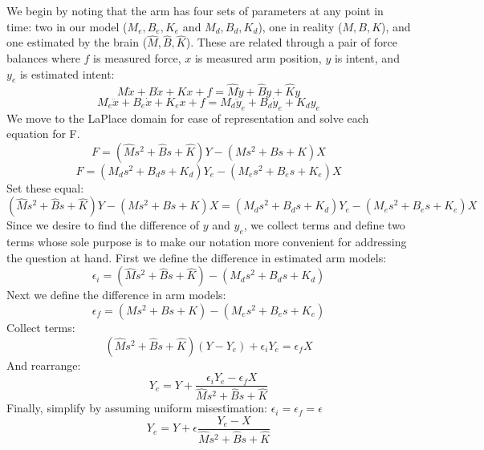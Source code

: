 \documentclass[10pt]{article}
\begin{document}
We begin by noting that the arm has four sets of parameters at any point in time: two in our model ($M_e, B_e, K_e$ and $M_d, B_d, K_d$), one in reality ($M, B, K$), and one estimated by the brain ($\hat{M}, \hat{B}, \hat{K}$). These are related through a pair of force balances where $f$ is measured force, $x$ is measured arm position, $y$ is intent, and $y_e$ is estimated intent:
\begin{equation}
M\ddot{x}+B\dot{x}+Kx+f=\hat{M}\ddot{y}+\hat{B}\dot{y}+\hat{K}y
\end{equation}
\begin{equation}
M_e\ddot{x}+B_e\dot{x}+K_ex+f=M_d\ddot{y}_e+B_d\dot{y}_e+K_dy_e
\end{equation}
We move to the LaPlace domain for ease of representation and solve each equation for F.
\begin{equation}
F=(\hat{M}s^2+\hat{B}s+\hat{K})Y-(Ms^2+Bs+K)X
\end{equation}
\begin{equation}
F=(M_ds^2+B_ds+K_d)Y_e-(M_es^2+B_es+K_e)X
\end{equation}
Set these equal:
\begin{equation}
(\hat{M}s^2+\hat{B}s+\hat{K})Y-(Ms^2+Bs+K)X=(M_ds^2+B_ds+K_d)Y_e-(M_es^2+B_es+K_e)X
\end{equation}
Since we desire to find the difference of $y$ and $y_e$, we collect terms and define two terms whose sole purpose is to make our notation more convenient for addressing the question at hand. First we define the difference in estimated arm models:
\begin{equation}
\epsilon_i=(\hat{M}s^2+\hat{B}s+\hat{K})-(M_ds^2+B_ds+K_d)
\end{equation}
Next we define the difference in arm models:
\begin{equation}
\epsilon_f=(Ms^2+Bs+K)-(M_es^2+B_es+K_e)
\end{equation}
Collect terms:
\begin{equation}
(\hat{M}s^2+\hat{B}s+\hat{K})(Y-Y_e)+\epsilon_i Y_e=\epsilon_f X
\end{equation}
And rearrange:
\begin{equation}
Y_e=Y+\frac{\epsilon_i Y_e-\epsilon_f X}{\hat{M}s^2+\hat{B}s+\hat{K}}
\end{equation}
Finally, simplify by assuming uniform misestimation: $\epsilon_i=\epsilon_f=\epsilon$
\begin{equation}
Y_e=Y+\epsilon\frac{Y_e-X}{\hat{M}s^2+\hat{B}s+\hat{K}}
\end{equation}
\end{document}
